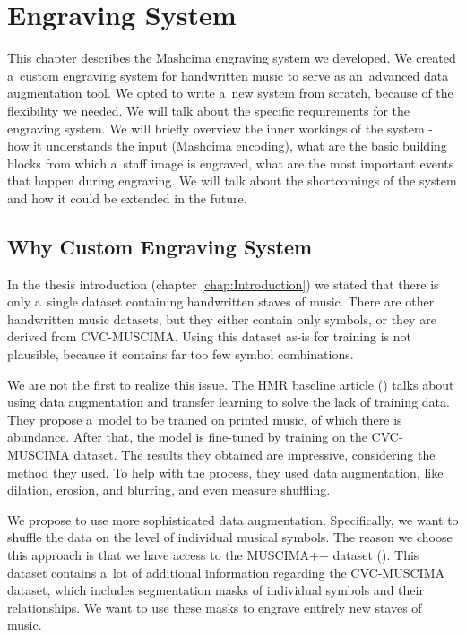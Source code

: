 \chapter{Engraving System}
\label{chap:EngravingSystem}

This chapter describes the Mashcima engraving system we developed. We created a~custom engraving system for handwritten music to serve as an~advanced data augmentation tool. We opted to write a~new system from scratch, because of the flexibility we needed. We will talk about the specific requirements for the engraving system. We will briefly overview the inner workings of the system - how it understands the input (Mashcima encoding), what are the basic building blocks from which a~staff image is engraved, what are the most important events that happen during engraving. We will talk about the shortcomings of the system and how it could be extended in the future.


\section{Why Custom Engraving System}

In the thesis introduction (chapter \ref{chap:Introduction}) we stated that there is only a~single dataset containing handwritten staves of music. There are other handwritten music datasets, but they either contain only symbols, or they are derived from CVC-MUSCIMA. Using this dataset as-is for training is not plausible, because it contains far too few symbol combinations.

We are not the first to realize this issue. The HMR baseline article (\cite{HmrBaseline}) talks about using data augmentation and transfer learning to solve the lack of training data. They propose a~model to be trained on printed music, of which there is abundance. After that, the model is fine-tuned by training on the CVC-MUSCIMA dataset. The results they obtained are impressive, considering the method they used. To help with the process, they used data augmentation, like dilation, erosion, and blurring, and even measure shuffling.

We propose to use more sophisticated data augmentation. Specifically, we want to shuffle the data on the level of individual musical symbols. The reason we choose this approach is that we have access to the MUSCIMA++ dataset (\cite{MuscimaPP}). This dataset contains a~lot of additional information regarding the CVC-MUSCIMA dataset, which includes segmentation masks of individual symbols and their relationships. We want to use these masks to engrave entirely new staves of music.

